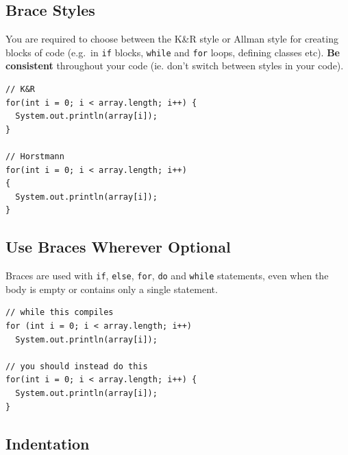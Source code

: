 \documentclass[11pt,DIV=23,landscape]{scrartcl}
\begin{document}
\subsection{Brace Styles}\label{brace-styles}

\begin{paracol}{2}
\begin{leftcolumn}
You are required to choose between the K\&R style or Allman style for
creating blocks of code (e.g.~in \lstinline{if} blocks, \lstinline{while} and
\lstinline{for} loops, defining classes etc). \textbf{Be consistent}
throughout your code (ie. don't switch between styles in your code).
\end{leftcolumn}

\begin{rightcolumn}
\begin{lstlisting}
// K&R
for(int i = 0; i < array.length; i++) {
  System.out.println(array[i]);
}

// Horstmann
for(int i = 0; i < array.length; i++)
{
  System.out.println(array[i]);
}
\end{lstlisting}
\end{rightcolumn}
\end{paracol}

\subsection{Use Braces Wherever
Optional}\label{use-braces-wherever-optional}

\begin{paracol}{2}
\begin{leftcolumn}
Braces are used with \lstinline{if}, \lstinline{else}, \lstinline{for},
\lstinline{do} and \lstinline{while} statements, even when the body is empty
or contains only a single statement.
\end{leftcolumn}

\begin{rightcolumn}
\begin{lstlisting}
// while this compiles
for (int i = 0; i < array.length; i++)
  System.out.println(array[i]);

// you should instead do this
for(int i = 0; i < array.length; i++) {
  System.out.println(array[i]);
}
\end{lstlisting}
\end{rightcolumn}
\end{paracol}

\subsection{Indentation}\label{indentation}
\end{document}
